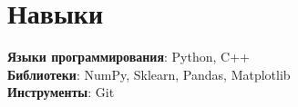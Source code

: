 \section{Навыки}
    \begin{itemize}[leftmargin=0.15in, label={}]
	\small{\item{
		 \textbf{Языки программирования}{: Python, C++} \\
		 \textbf{Библиотеки}{: NumPy, Sklearn, Pandas, Matplotlib} \\
		 \textbf{Инструменты}{: Git} \\
	}}
    \end{itemize}
